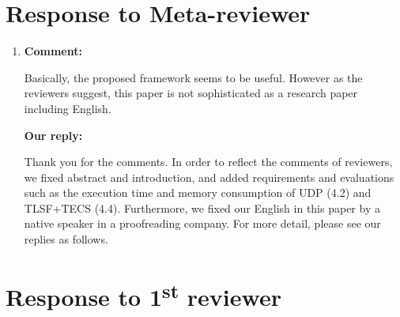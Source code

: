 \documentclass{article}
\newcommand\st{\textsuperscript{st}\xspace}
\begin{document}
\section{Response to Meta-reviewer}
\begin{enumerate}

\item \begin{flushleft}
\textbf{Comment:}

Basically, the proposed framework seems to be useful.
However as the reviewers suggest, this paper is not sophisticated as a research paper including English.

\end{flushleft}

\begin{flushleft}
\textbf{Our reply:}

Thank you for the comments.
In order to reflect the comments of reviewers, we fixed abstract and introduction, and added requirements and evaluations such as the execution time and memory consumption of UDP (4.2) and TLSF+TECS (4.4).
Furthermore, we fixed our English in this paper by a native speaker in a proofreading company.
For more detail, please see our replies as follows.

\end{flushleft}


\end{enumerate}

\clearpage


\section{Response to 1\st reviewer}
\end{document}
